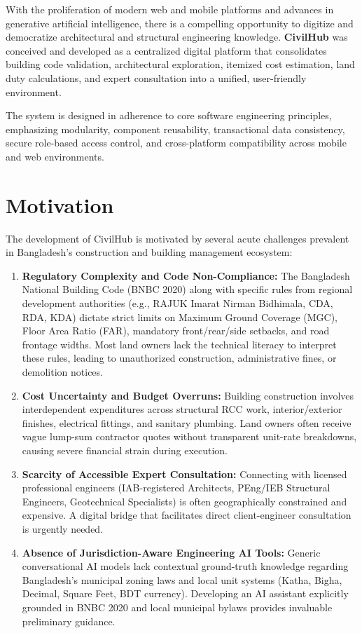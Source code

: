 \documentclass[12pt,a4paper]{article}
\begin{document}
With the proliferation of modern web and mobile platforms and advances in generative artificial intelligence, there is a compelling opportunity to digitize and democratize architectural and structural engineering knowledge. \textbf{CivilHub} was conceived and developed as a centralized digital platform that consolidates building code validation, architectural exploration, itemized cost estimation, land duty calculations, and expert consultation into a unified, user-friendly environment.

The system is designed in adherence to core software engineering principles, emphasizing modularity, component reusability, transactional data consistency, secure role-based access control, and cross-platform compatibility across mobile and web environments.

\section{Motivation}
The development of CivilHub is motivated by several acute challenges prevalent in Bangladesh's construction and building management ecosystem:
\begin{enumerate}
    \item \textbf{Regulatory Complexity and Code Non-Compliance:} The Bangladesh National Building Code (BNBC 2020) along with specific rules from regional development authorities (e.g., RAJUK Imarat Nirman Bidhimala, CDA, RDA, KDA) dictate strict limits on Maximum Ground Coverage (MGC), Floor Area Ratio (FAR), mandatory front/rear/side setbacks, and road frontage widths. Most land owners lack the technical literacy to interpret these rules, leading to unauthorized construction, administrative fines, or demolition notices.
    \item \textbf{Cost Uncertainty and Budget Overruns:} Building construction involves interdependent expenditures across structural RCC work, interior/exterior finishes, electrical fittings, and sanitary plumbing. Land owners often receive vague lump-sum contractor quotes without transparent unit-rate breakdowns, causing severe financial strain during execution.
    \item \textbf{Scarcity of Accessible Expert Consultation:} Connecting with licensed professional engineers (IAB-registered Architects, PEng/IEB Structural Engineers, Geotechnical Specialists) is often geographically constrained and expensive. A digital bridge that facilitates direct client-engineer consultation is urgently needed.
    \item \textbf{Absence of Jurisdiction-Aware Engineering AI Tools:} Generic conversational AI models lack contextual ground-truth knowledge regarding Bangladesh's municipal zoning laws and local unit systems (Katha, Bigha, Decimal, Square Feet, BDT currency). Developing an AI assistant explicitly grounded in BNBC 2020 and local municipal bylaws provides invaluable preliminary guidance.
\end{enumerate}
\end{document}
